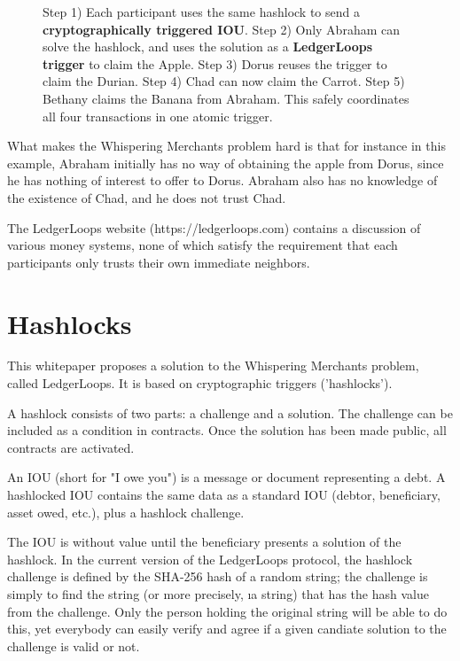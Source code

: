 \documentclass[11pt,twoside,a4paper]{article}
\begin{document}
\begin{figure}
\caption{Step 1) Each participant uses the same hashlock to send a \textbf{\color{cyan} cryptographically triggered IOU}. Step 2) Only Abraham can solve the hashlock, and uses the solution as a \textbf{\color{magenta} LedgerLoops trigger} to claim the {\color{red} Apple}. Step 3) Dorus reuses the trigger to claim the {\color{green} Durian}. Step 4) Chad can now claim the {\color{orange} Carrot}. Step 5) Bethany claims the {\color{yellow} Banana} from Abraham. This safely coordinates all four transactions in one atomic trigger.}
\end{figure}

What makes the Whispering Merchants problem hard is that for instance in this example, Abraham initially has no way of obtaining the apple from Dorus, since he has nothing of interest to offer to Dorus. Abraham also has no knowledge of the existence of Chad, and he does not trust Chad.

The LedgerLoops website (https://ledgerloops.com) contains a discussion of various money systems, none of which satisfy the requirement that each participants only trusts their own immediate neighbors.

\section{Hashlocks}
This whitepaper proposes a solution to the Whispering Merchants problem, called LedgerLoops. It is based on cryptographic triggers ('hashlocks').

A hashlock consists of two parts: a challenge and a solution. The challenge can be included as a condition in contracts. Once the solution has been made public, all contracts are activated.

An IOU (short for "I owe you") is a message or document representing a debt.
A hashlocked IOU contains the same data as a standard IOU (debtor, beneficiary, asset owed, etc.), plus a hashlock challenge.

The IOU is without value until the beneficiary presents a solution of the hashlock. In the current version of the LedgerLoops protocol, the hashlock challenge is defined by the SHA-256 hash of a random string; the challenge is simply to find the string (or more precisely, {\i a} string) that has the hash value from the challenge. Only the person holding the original string will be able to do this, yet everybody can easily verify and agree if a given candiate solution to the challenge is valid or not.
\end{document}
